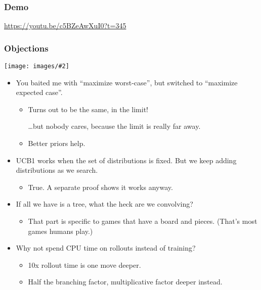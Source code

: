 \documentclass[table]{beamer}
\newcommand\img[2]{\texttt{[image: images/\#2]}}
\begin{document}
\begin{frame}
	\frametitle{Demo}
	\url{https://youtu.be/c5BZeAwXuI0?t=345}
	\addtocounter{framenumber}{-1}
\end{frame}

\begin{frame}
	\frametitle{Objections}
	\begin{center}
		\img{0.25}{trap-card.jpg}
	\end{center}

	\begin{itemize}
		\item You baited me with ``maximize worst-case'', but switched to
			``maximize expected case''.
			\begin{itemize}
				\item Turns out to be the same, in the limit!

					\ldots{}but nobody cares, because the limit is really
					far away.
				\item Better priors help.
			\end{itemize}
		\item UCB1 works when the set of distributions is fixed. But we keep
			adding distributions as we search.
			\begin{itemize}
				\item True. A separate proof shows it works anyway.
			\end{itemize}
		\item If all we have is a tree, what the heck are we convolving?
			\begin{itemize}
				\item That part is specific to games that have a board and
					pieces. (That's most games humans play.)
			\end{itemize}
		\item Why not spend CPU time on rollouts instead of training?
			\begin{itemize}
				\item 10x rollout time is one move deeper.
				\item Half the branching factor, multiplicative factor
					deeper instead.
			\end{itemize}
	\end{itemize}
	\addtocounter{framenumber}{-1}
\end{frame}
\end{document}
